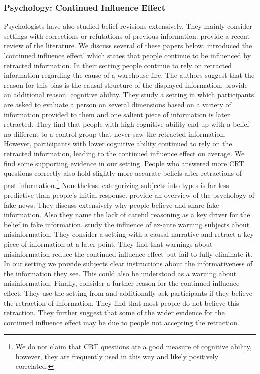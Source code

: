 \documentclass{article}
\begin{document}
\subsubsection*{Psychology: Continued Influence Effect}

Psychologists have also studied belief revisions extensively. They mainly consider settings with corrections or refutations of previous information. \cite{Ecker2022} provide a recent review of the literature. We discuss several of these papers below. \cite{Johnson1994} introduced the 'continued influence effect' which states that people continue to be influenced by retracted information. In their setting people continue to rely on retracted information regarding the cause of a warehouse fire. The authors suggest that the reason for this bias is the causal structure of the displayed information. \cite{Roets2017} provide an additional reason: cognitive ability. They study a setting in which participants are asked to evaluate a person on several dimensions based on a variety of information provided to them and one salient piece of information is later retracted. They find that people with high cognitive ability end up with a belief no different to a control group that never saw the retracted information. However, participants with lower cognitive ability continued to rely on the retracted information, leading to the continued influence effect on average. We find some supporting evidence in our setting. People who answered more CRT questions correctly also hold slightly more accurate beliefs after retractions of past information.\footnote{We do not claim that CRT questions are a good measure of cognitive ability, however, they are frequently used in this way \citep[see e.g.][]{Hoppe2011} and likely positively correlated.} Nonetheless, categorizing subjects into types is far less predictive than people's initial response. \cite{Pennycook2021} provide an overview of the psychology of fake news. They discuss extensively why people believe and share fake information. Also they name the lack of careful reasoning as a key driver for the belief in fake information. \cite{Ecker2010} study the influence of ex-ante warning subjects about misinformation. They consider a setting with a causal narrative and retract a key piece of information at a later point. They find that warnings about misinformation reduce the continued influence effect but fail to fully eliminate it. In our setting we provide subjects clear instructions about the informativeness of the information they see. This could also be understood as a warning about misinformation. Finally, \cite{Orear2020} consider a further reason for the continued influence effect. They use the setting from \cite{Ecker2010} and additionally ask participants if they believe the retraction of information. They find that most people do not believe this retraction. They further suggest that some of the wider evidence for the continued influence effect may be due to people not accepting the retraction.
\end{document}
